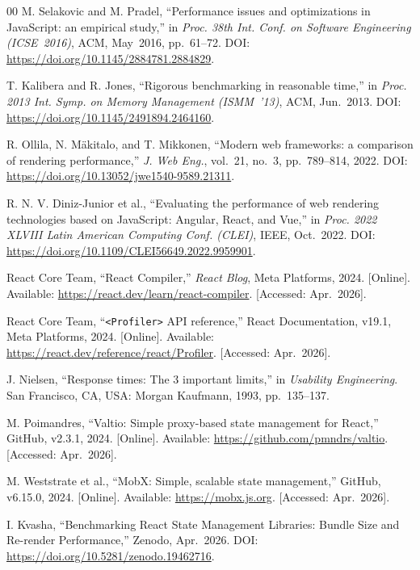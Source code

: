 \documentclass[conference]{IEEEtran}
\begin{document}
\begin{thebibliography}{00}
M. Selakovic and M. Pradel, ``Performance issues and optimizations in
JavaScript: an empirical study,'' in \textit{Proc. 38th Int. Conf. on
Software Engineering (ICSE~2016)}, ACM, May~2016, pp.~61--72.
DOI: \url{https://doi.org/10.1145/2884781.2884829}.

T. Kalibera and R. Jones, ``Rigorous benchmarking in reasonable time,''
in \textit{Proc. 2013 Int. Symp. on Memory Management (ISMM~'13)},
ACM, Jun.~2013.
DOI: \url{https://doi.org/10.1145/2491894.2464160}.

R. Ollila, N. M\"{a}kitalo, and T. Mikkonen, ``Modern web frameworks:
a comparison of rendering performance,'' \textit{J. Web Eng.},
vol.~21, no.~3, pp.~789--814, 2022.
DOI: \url{https://doi.org/10.13052/jwe1540-9589.21311}.

R. N. V. Diniz-Junior et al., ``Evaluating the performance of web
rendering technologies based on JavaScript: Angular, React, and Vue,''
in \textit{Proc. 2022 XLVIII Latin American Computing Conf. (CLEI)},
IEEE, Oct.~2022.
DOI: \url{https://doi.org/10.1109/CLEI56649.2022.9959901}.

React Core Team, ``React Compiler,'' \textit{React Blog}, Meta
Platforms, 2024.
[Online]. Available: \url{https://react.dev/learn/react-compiler}.
[Accessed: Apr.~2026].

React Core Team, ``\texttt{<Profiler>} API reference,'' React
Documentation, v19.1, Meta Platforms, 2024.
[Online]. Available: \url{https://react.dev/reference/react/Profiler}.
[Accessed: Apr.~2026].

J. Nielsen, ``Response times: The 3 important limits,'' in
\textit{Usability Engineering}. San Francisco, CA, USA:
Morgan Kaufmann, 1993, pp.~135--137.

M. Poimandres, ``Valtio: Simple proxy-based state management for
React,'' GitHub, v2.3.1, 2024.
[Online]. Available: \url{https://github.com/pmndrs/valtio}.
[Accessed: Apr.~2026].

M. Weststrate et al., ``MobX: Simple, scalable state management,''
GitHub, v6.15.0, 2024.
[Online]. Available: \url{https://mobx.js.org}.
[Accessed: Apr.~2026].

I. Kvasha, ``Benchmarking React State Management Libraries: Bundle Size
and Re-render Performance,'' Zenodo, Apr.~2026.
DOI: \url{https://doi.org/10.5281/zenodo.19462716}.

\end{thebibliography}
\end{document}
